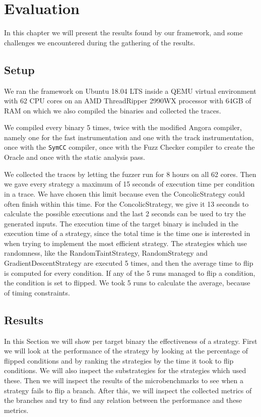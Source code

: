 
\chapter{Evaluation}\label{chap:evaluation} %
In this chapter we will present the results found by our framework, and some challenges we encountered during the gathering of the results.

\section{Setup}
We ran the framework on Ubuntu 18.04 LTS inside a QEMU virtual environment with 62 CPU cores on an AMD ThreadRipper 2990WX processor with 64GB of RAM on which we also compiled the binaries and collected the traces.

We compiled every binary 5 times, twice with the modified Angora compiler, namely one for the fast instrumentation and one with the track instrumentation, once with the \texttt{SymCC} compiler, once with the Fuzz Checker compiler to create the Oracle and once with the static analysis pass.

We collected the traces by letting the fuzzer run for 8 hours on all 62 cores. Then we gave every strategy a maximum of 15 seconds of execution time per condition in a trace. We have chosen this limit because even the ConcolicStrategy could often finish within this time. For the ConcolicStrategy, we give it 13 seconds to calculate the possible executions and the last 2 seconds can be used to try the generated inputs. The execution time of the target binary is included in the execution time of a strategy, since the total time is the time one is interested in when trying to implement the most efficient strategy. The strategies which use randomness, like the RandomTaintStrategy, RandomStrategy and GradientDescentStrategy are executed 5 times, and then the average time to flip is computed for every condition. If any of the 5 runs managed to flip a condition, the condition is set to flipped. We took 5 runs to calculate the average, because of timing constraints.


\section{Results}
In this Section we will show per target binary the effectiveness of a strategy. First we will look at the performance of the strategy by looking at the percentage of flipped conditions and by ranking the strategies by the time it took to flip conditions. We will also inspect the substrategies for the strategies which used these. Then we will inspect the results of the microbenchmarks to see when a strategy fails to flip a branch. After this, we will inspect the collected metrics of the branches and try to find any relation between the performance and these metrics.

